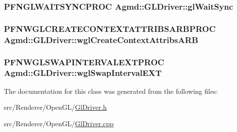 \hypertarget{class_agmd_1_1_g_l_driver_a619b7422381e6ce3ad0b1c268a65dd3e}{
\subsubsection[{gl\+Wait\+Sync}]{\setlength{\rightskip}{0pt plus 5cm}P\+F\+N\+G\+L\+W\+A\+I\+T\+S\+Y\+N\+C\+P\+R\+O\+C Agmd\+::\+G\+L\+Driver\+::gl\+Wait\+Sync\hspace{0.3cm}{\ttfamily [static]}}}\label{class_agmd_1_1_g_l_driver_a619b7422381e6ce3ad0b1c268a65dd3e}
\hypertarget{class_agmd_1_1_g_l_driver_abd56505ddf55fe13d396534d0ae77baa}{
\subsubsection[{wgl\+Create\+Context\+Attribs\+A\+R\+B}]{\setlength{\rightskip}{0pt plus 5cm}P\+F\+N\+W\+G\+L\+C\+R\+E\+A\+T\+E\+C\+O\+N\+T\+E\+X\+T\+A\+T\+T\+R\+I\+B\+S\+A\+R\+B\+P\+R\+O\+C Agmd\+::\+G\+L\+Driver\+::wgl\+Create\+Context\+Attribs\+A\+R\+B\hspace{0.3cm}{\ttfamily [static]}}}\label{class_agmd_1_1_g_l_driver_abd56505ddf55fe13d396534d0ae77baa}
\hypertarget{class_agmd_1_1_g_l_driver_ae8375296a8a17c17f8292cab6dacc2fb}{
\subsubsection[{wgl\+Swap\+Interval\+E\+X\+T}]{\setlength{\rightskip}{0pt plus 5cm}P\+F\+N\+W\+G\+L\+S\+W\+A\+P\+I\+N\+T\+E\+R\+V\+A\+L\+E\+X\+T\+P\+R\+O\+C Agmd\+::\+G\+L\+Driver\+::wgl\+Swap\+Interval\+E\+X\+T\hspace{0.3cm}{\ttfamily [static]}}}\label{class_agmd_1_1_g_l_driver_ae8375296a8a17c17f8292cab6dacc2fb}


The documentation for this class was generated from the following files\+:\begin{DoxyCompactItemize}
\item 
src/\+Renderer/\+Open\+G\+L/\hyperlink{_gl_driver_8h}{Gl\+Driver.\+h}\item 
src/\+Renderer/\+Open\+G\+L/\hyperlink{_gl_driver_8cpp}{Gl\+Driver.\+cpp}\end{DoxyCompactItemize}
